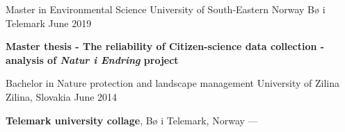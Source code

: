 
\begin{cventries}
  \cventry
    {Master in Environmental Science} %
    {University of South-Eastern Norway} %
    {Bø i Telemark} %
    {June 2019} %
    {
      \begin{cvitems}
        \item  {\textbf{Master thesis - The reliability of Citizen-science data collection - analysis of \textit{Natur i Endring} project}}
      \end{cvitems}
    }

  \vspace{0.5mm}
  \cventry
    {Bachelor in Nature protection and landscape management} %
    {University of Zilina} %
    {Zilina, Slovakia} %
    {June 2014} %
    {
      \begin{cvitems} %
         \item {\textbf{Telemark university collage}, Bø i Telemark, Norway --- }
      \end{cvitems}
    }

\end{cventries}
